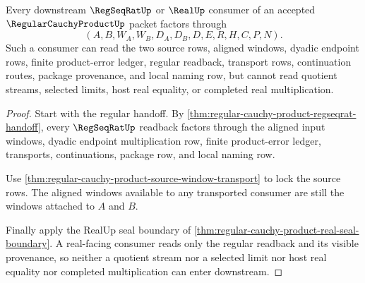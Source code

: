 \begin{theorem}
\label{thm:regular-cauchy-product-downstream-source-lock}
Every downstream $\RegSeqRatUp$ or $\RealUp$ consumer of an accepted $\RegularCauchyProductUp$ packet factors through
$$
(A,B,W_A,W_B,D_A,D_B,D,E,R,H,C,P,N).
$$
Such a consumer can read the two source rows, aligned windows, dyadic endpoint rows, finite product-error ledger, regular readback, transport rows, continuation routes, package provenance, and local naming row, but cannot read quotient streams, selected limits, host real equality, or completed real multiplication.
\end{theorem}
\begin{proof}
Start with the regular handoff. By \autoref{thm:regular-cauchy-product-regseqrat-handoff}, every $\RegSeqRatUp$ readback factors through the aligned input windows, dyadic endpoint multiplication row, finite product-error ledger, transports, continuations, package row, and local naming row.

Use \autoref{thm:regular-cauchy-product-source-window-transport} to lock the source rows. The aligned windows available to any transported consumer are still the windows attached to $A$ and $B$.

Finally apply the RealUp seal boundary of \autoref{thm:regular-cauchy-product-real-seal-boundary}. A real-facing consumer reads only the regular readback and its visible provenance, so neither a quotient stream nor a selected limit nor host real equality nor completed multiplication can enter downstream.
\end{proof}

